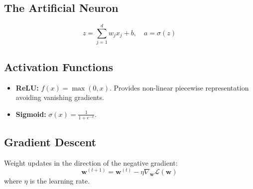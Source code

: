 \documentclass[11pt,a4paper]{article}
\begin{document}
\subsection{The Artificial Neuron}
\begin{equation}
z = \sum_{j=1}^d w_j x_j + b, \quad a = \sigma(z)
\end{equation}

\subsection{Activation Functions}
\begin{itemize}
    \item \textbf{ReLU:} $f(x) = \max(0, x)$. Provides non-linear piecewise representation avoiding vanishing gradients.
    \item \textbf{Sigmoid:} $\sigma(x) = \frac{1}{1 + e^{-x}}$.
\end{itemize}

\subsection{Gradient Descent}
Weight updates in the direction of the negative gradient:
\begin{equation}
\mathbf{w}^{(t+1)} = \mathbf{w}^{(t)} - \eta \nabla_{\mathbf{w}} \mathcal{L}(\mathbf{w})
\end{equation}
where $\eta$ is the learning rate.
\end{document}
